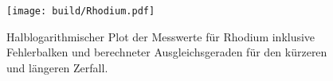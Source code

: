 \begin{figure}[H]
    \centering
    \texttt{[image: build/Rhodium.pdf]}
    \caption{Halblogarithmischer Plot der Messwerte für Rhodium inklusive Fehlerbalken und berechneter Ausgleichsgeraden
    für den kürzeren und längeren Zerfall.}
    \label{fig:Rh}
\end{figure}